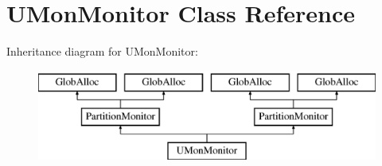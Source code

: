 \hypertarget{classUMonMonitor}{\section{U\-Mon\-Monitor Class Reference}
\label{classUMonMonitor}
}
Inheritance diagram for U\-Mon\-Monitor\-:\begin{figure}[H]
\begin{center}
\leavevmode
\includegraphics[height=3.000000cm]{classUMonMonitor}
\end{center}
\end{figure}
